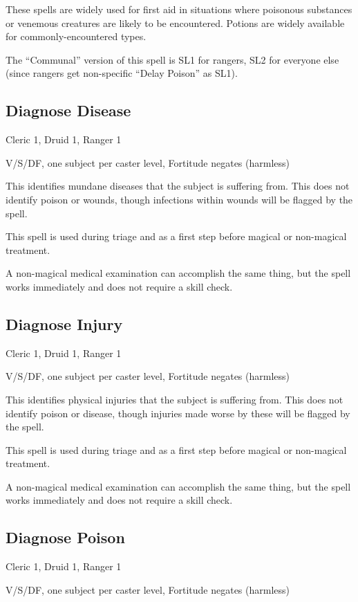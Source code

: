 These spells are widely used for first aid in situations where poisonous
substances or venemous creatures are likely to be encountered. Potions are
widely available for commonly-encountered types.

The ``Communal'' version of this spell is SL1 for rangers, SL2 for
everyone else (since rangers get non-specific ``Delay Poison'' as SL1).
%

%
\subsection{Diagnose Disease}

Cleric 1, Druid 1, Ranger 1

V/S/DF, one subject per caster level, Fortitude negates (harmless)

This identifies mundane diseases that the subject is suffering from. This
does not identify poison or wounds, though infections within wounds will
be flagged by the spell.

This spell is used during triage and as a first step before magical or
non-magical treatment.

A non-magical medical examination can accomplish the same thing, but the
spell works immediately and does not require a skill check.
%

%
\subsection{Diagnose Injury}

Cleric 1, Druid 1, Ranger 1

V/S/DF, one subject per caster level, Fortitude negates (harmless)

This identifies physical injuries that the subject is suffering from. This
does not identify poison or disease, though injuries made worse by these
will be flagged by the spell.

This spell is used during triage and as a first step before magical or
non-magical treatment.

A non-magical medical examination can accomplish the same thing, but the
spell works immediately and does not require a skill check.
%

%
\subsection{Diagnose Poison}

Cleric 1, Druid 1, Ranger 1

V/S/DF, one subject per caster level, Fortitude negates (harmless)

